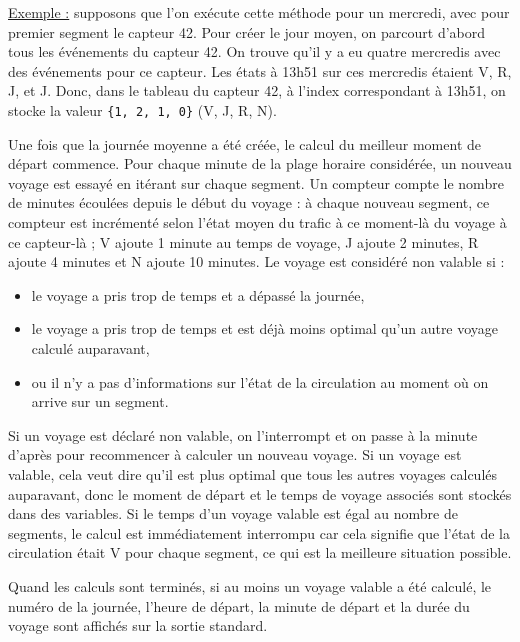 \documentclass[11pt,a4paper]{article}
\begin{document}
\underline{Exemple :} supposons que l'on exécute cette méthode pour un mercredi, avec pour premier segment le capteur 42. Pour créer le jour moyen, on parcourt d'abord tous les événements du capteur 42. On trouve qu'il y a eu quatre mercredis avec des événements pour ce capteur. Les états à 13h51 sur ces mercredis étaient V, R, J, et J. Donc, dans le tableau du capteur 42, à l'index correspondant à 13h51, on stocke la valeur \texttt{\{1, 2, 1, 0\}} (V, J, R, N).

Une fois que la journée moyenne a été créée, le calcul du meilleur moment de départ commence. Pour chaque minute de la plage horaire considérée, un nouveau voyage est essayé en itérant sur chaque segment. Un compteur compte le nombre de minutes écoulées depuis le début du voyage : à chaque nouveau segment, ce compteur est incrémenté selon l'état moyen du trafic à ce moment-là du voyage à ce capteur-là ; V ajoute 1 minute au temps de voyage, J ajoute 2 minutes, R ajoute 4 minutes et N ajoute 10 minutes. Le voyage est considéré non valable si :

\begin{itemize}
  \item le voyage a pris trop de temps et a dépassé la journée,
  \item le voyage a pris trop de temps et est déjà moins optimal qu'un autre voyage calculé auparavant,
  \item ou il n'y a pas d'informations sur l'état de la circulation au moment où on arrive sur un segment.
\end{itemize}

Si un voyage est déclaré non valable, on l'interrompt et on passe à la minute d'après pour recommencer à calculer un nouveau voyage. Si un voyage est valable, cela veut dire qu'il est plus optimal que tous les autres voyages calculés auparavant, donc le moment de départ et le temps de voyage associés sont stockés dans des variables. Si le temps d'un voyage valable est égal au nombre de segments, le calcul est immédiatement interrompu car cela signifie que l'état de la circulation était V pour chaque segment, ce qui est la meilleure situation possible.

Quand les calculs sont terminés, si au moins un voyage valable a été calculé, le numéro de la journée, l'heure de départ, la minute de départ et la durée du voyage sont affichés sur la sortie standard.
\end{document}
